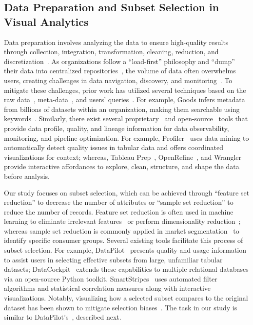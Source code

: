 \subsection{Data Preparation and Subset Selection in Visual Analytics}
Data preparation involves analyzing the data to ensure high-quality results through collection, integration, transformation, cleaning, reduction, and discretization~\cite{dataprep2003zhang}.
As organizations follow a ``load-first'' philosophy and ``dump'' their data into centralized repositories~\cite{gitelman2013raw}, the volume of data often overwhelms users, creating challenges in data navigation, discovery, and monitoring~\cite{deng2017data,fernandez2018aurum, nargesian2020organizing, nargesian2019datalakemanagement}. 
To mitigate these challenges, prior work has utilized several techniques based on the raw data~\cite{deng2017data, miller2018making}, meta-data~\cite{halevy2016goods, monosi}, and users' queries~\cite{brackenbury2018draining,cafarella2009data,zhang2020finding}.
For example, Goods infers metadata from billions of datasets within an organization, making them searchable using keywords~\cite{halevy2016goods}.
Similarly, there exist several proprietary~\cite{montecarlodata, bigeye, datafold} and open-source~\cite{sqllineage,datafold} tools that provide data profile, quality, and lineage information for data observability, monitoring, and pipeline optimization.
For example, 
Profiler~\cite{kandel2012profiler} uses data mining to automatically detect quality issues in tabular data and offers coordinated visualizations for context; whereas, Tableau Prep~\cite{tableauprep}, OpenRefine~\cite{ham2013openrefine}, and Wrangler~\cite{kandel2011wrangler} provide interactive affordances to explore, clean, structure, and shape the data before analysis.

Our study focuses on subset selection, which can be achieved through ``feature set reduction'' to decrease the number of attributes or ``sample set reduction'' to reduce the number of records. Feature set reduction is often used in machine learning to eliminate irrelevant features~\cite{featureselection2015jovic} or perform dimensionality reduction~\cite{fodor2002survey}; whereas sample set reduction is commonly applied in market segmentation~\cite{tynan1987market} to identify specific consumer groups.
Several existing tools facilitate this process of subset selection.
For example, DataPilot~\cite{narechania2023datapilot} presents quality and usage information to assist users in selecting effective subsets from large, unfamiliar tabular datasets; 
DataCockpit~\cite{narechania2023datacockpit} extends these capabilities to multiple relational databases via an open-source Python toolkit.
SmartStripes~\cite{may2011guiding} uses automated filter algorithms and statistical correlation measures along with interactive visualizations.
Notably, visualizing how a selected subset compares to the original dataset has been shown to mitigate selection biases~\cite{gotz2016adaptive, borland2019selection}.
The task in our study is similar to DataPilot's~\cite{narechania2023datapilot}, described next.